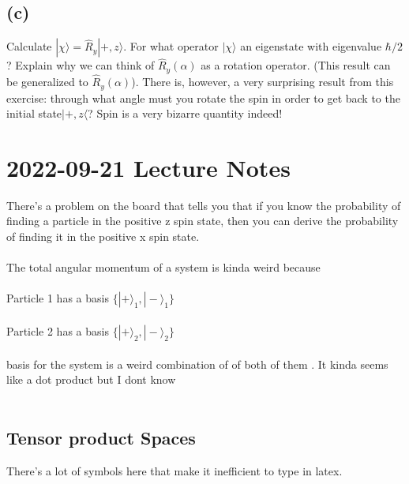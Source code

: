 \documentclass[12pt, a4paper]{article}
\begin{document}
\subsection*{(c)}
Calculate $|\chi\rangle = \hat{R}_y |+,z\rangle$. For what operator $|\chi\rangle$ an eigenstate with eigenvalue $\hbar/2$? Explain why we can think of $\hat{R}_y(\alpha)$ as a rotation operator. (This result can be generalized to $\hat{R}_y(\alpha)$). There is, however, a very surprising result from this exercise: through what angle must you rotate the spin in order to get back to the initial state$|+,z\langle$? Spin is a very bizarre quantity indeed!




\section*{2022-09-21 Lecture Notes}

There's a problem on the board that tells you that if you know the probability of finding a particle in the positive z spin state, then you can derive the probability of finding it in the positive x spin state. \\
\\
The total angular momentum of a system is kinda weird because \\
\\
Particle 1 has a basis $\lbrace |+\rangle_1, |-\rangle_1\rbrace$\\
\\
Particle 2 has a basis $\lbrace |+\rangle_2, |-\rangle_2\rbrace$\\
\\
basis for the system is a weird combination of of both of them . It kinda seems like a dot product but I dont know\\
\\
\subsection*{Tensor product Spaces}
There's a lot of symbols here that make it inefficient to type in latex. 
\end{document}
